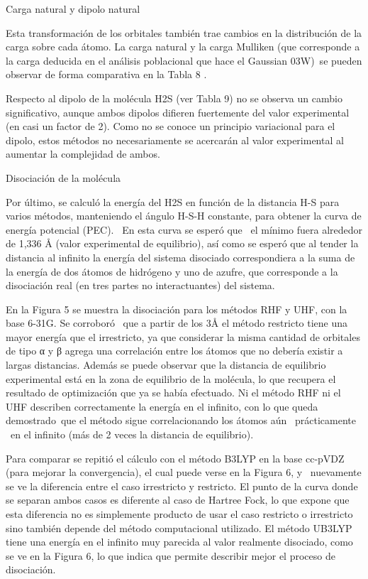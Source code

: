 \documentclass[]{article}
\begin{document}
{}

{Carga natural y dipolo natural}

{Esta transformación de los orbitales también trae cambios en la
distribución de la carga sobre cada átomo. La carga natural y la carga
Mulliken (que corresponde a la carga deducida en el análisis poblacional
que hace el }{Gaussian 03W)}{~se pueden observar de forma comparativa en
la Tabla 8 . }

{Respecto al dipolo de la molécula H}{2}{S (ver Tabla 9) no se observa
un cambio significativo, aunque ambos dipolos difieren fuertemente del
valor experimental (en casi un factor de 2). Como no se conoce un
principio variacional para el dipolo, estos métodos no necesariamente se
acercarán al valor experimental al aumentar la complejidad de ambos.}

{}

{Disociación de la molécula}

{Por último, se calculó la energía del H}{2}{S en función de la
distancia H-S para varios métodos, manteniendo el ángulo H-S-H
constante, para obtener la curva de energía potencial (PEC). ~En esta
curva se esperó que ~el mínimo fuera alrededor de 1,336 Å (valor
experimental de equilibrio), así como se esperó que al tender la
distancia al infinito la energía del sistema disociado correspondiera a
la suma de la energía de dos átomos de hidrógeno y uno de azufre, que
corresponde a la disociación real (en tres partes no interactuantes) del
sistema.}

{En la Figura 5 se muestra la disociación para los métodos RHF y UHF,
con la base 6-31G. Se corroboró ~que a partir de los 3Å el método
restricto tiene una mayor energía que el irrestricto, ya que considerar
la misma cantidad de orbitales de tipo α y β agrega una correlación
entre los átomos que no debería existir a largas distancias. Además se
puede observar que la distancia de equilibrio experimental está en la
zona de equilibrio de la molécula, lo que recupera el resultado de
optimización que ya se había efectuado. }{Ni el método RHF ni el UHF
describen correctamente la energía en el infinito, con lo que queda
demostrado}{~que el método sigue correlacionando los átomos aún
~prácticamente ~en el infinito (más de 2 veces la distancia de
equilibrio).}

{Para comparar se repitió el cálculo con el método B3LYP en la base
cc-pVDZ (para mejorar la convergencia), el cual puede verse en la Figura
6, y ~nuevamente se ve la diferencia entre el caso irrestricto y
restricto. El punto de la curva donde se separan ambos casos es
diferente al caso de Hartree Fock, lo que expone que esta diferencia no
es simplemente producto de usar el caso restricto o irrestricto sino
también depende del método computacional utilizado}{. El método UB3LYP
tiene una energía en el infinito muy parecida al valor realmente
disociado, como se ve en la Figura 6, lo que indica que permite
describir mejor el proceso de disociación. }
\end{document}
